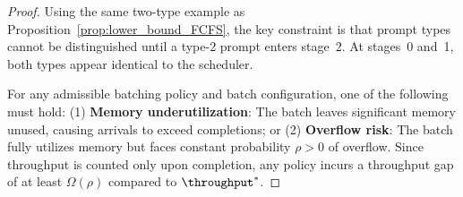 \begin{proof}
Using the same two-type example as Proposition~\ref{prop:lower_bound_FCFS}, the key constraint is that prompt types cannot be distinguished until a type-2 prompt enters stage~2. At stages~0 and~1, both types appear identical to the scheduler.

For any admissible batching policy and batch configuration, one of the following must hold: (1) \textbf{Memory underutilization}: The batch leaves significant memory unused, causing arrivals to exceed completions; or (2) \textbf{Overflow risk}: The batch fully utilizes memory but faces constant probability $\rho > 0$ of overflow. Since throughput is counted only upon completion, any policy incurs a throughput gap of at least $\Omega(\rho)$ compared to $\throughput^*$.
\end{proof}
